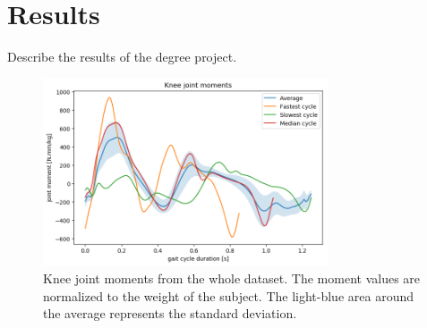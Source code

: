 \documentclass[../main.tex]{subfiles}
\begin{document}
\chapter{Results}
Describe the results of the degree project.

\begin{figure}
    \centering
    \includegraphics[width=0.75\textwidth]{img/results/knee_joint_moments.png}
    \caption{Knee joint moments from the whole dataset. The moment values are normalized to the weight of the subject. The light-blue area around the average represents the standard deviation.}
    \label{fig:knee-joint-moments-stat}
\end{figure}
\end{document}
